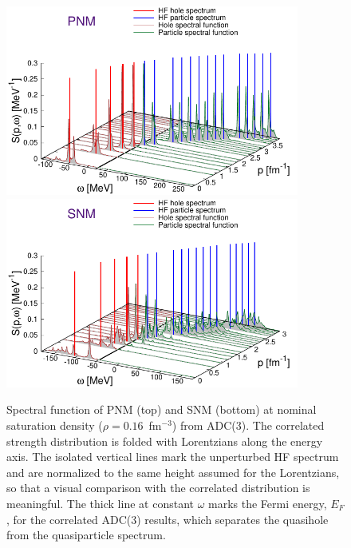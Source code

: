 \begin{figure}[ht]
\begin{center}
\includegraphics[width=0.86\textwidth]{Chapter11-figures/spect_funct_3D_pnm.pdf} \\  \vspace{0.06\textwidth}
\includegraphics[width=0.86\textwidth]{Chapter11-figures/spect_funct_3D_snm.pdf} \\
\caption{Spectral function of PNM (top) and SNM (bottom) at nominal saturation density ($\rho=0.16$~fm$^{-3}$) from ADC(3).
The correlated strength distribution is folded with Lorentzians along the energy axis. The isolated vertical lines mark the unperturbed HF spectrum and are normalized to the same height assumed for the Lorentzians, so that a visual comparison with the correlated distribution is meaningful.
The thick line at constant $\omega$ marks the Fermi energy, $E_F$, for the correlated ADC(3) results, which separates the quasihole from the quasiparticle spectrum.
}
\label{fig:minn_adc_sfnct}
\end{center}
\end{figure}


